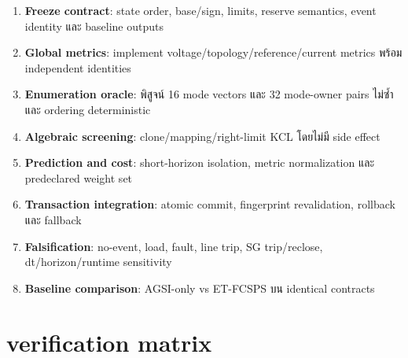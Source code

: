 \documentclass[12pt,a4paper]{article}
\begin{document}
\begin{enumerate}
  \item \textbf{Freeze contract}: state order, base/sign, limits, reserve semantics, event identity และ baseline outputs
  \item \textbf{Global metrics}: implement voltage/topology/reference/current metrics พร้อม independent identities
  \item \textbf{Enumeration oracle}: พิสูจน์ 16 mode vectors และ 32 mode-owner pairs ไม่ซ้ำและ ordering deterministic
  \item \textbf{Algebraic screening}: clone/mapping/right-limit KCL โดยไม่มี side effect
  \item \textbf{Prediction and cost}: short-horizon isolation, metric normalization และ predeclared weight set
  \item \textbf{Transaction integration}: atomic commit, fingerprint revalidation, rollback และ fallback
  \item \textbf{Falsification}: no-event, load, fault, line trip, SG trip/reclose, dt/horizon/runtime sensitivity
  \item \textbf{Baseline comparison}: AGSI-only vs ET-FCSPS บน identical contracts
\end{enumerate}

\section{verification matrix}
\end{document}
